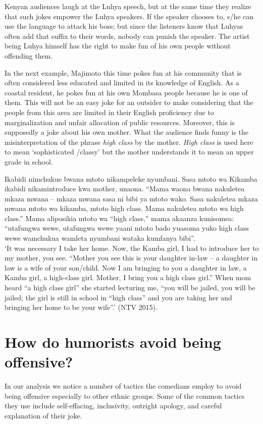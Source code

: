 \documentclass[output=paper]{langsci/langscibook}
\begin{document}
   Kenyan audiences laugh at the Luhya speech, but at the same time they realize that such jokes empower the Luhya speakers. If the speaker chooses to, s/he can use the language to attack his boss; but since the listeners know that Luhyas often add that suffix to their words, nobody can punish the speaker. The artist being Luhya himself has the right to make fun of his own people without offending them. 

In the next example, Majimoto this time pokes fun at his community that is often considered less educated and limited in its knowledge of English. As a coastal resident, he pokes fun at his own Mombasa people because he is one of them. This will not be an easy joke for an outsider to make considering that the people from this area are limited in their English proficiency due to marginalization and unfair allocation of public resources. Moreover, this is supposedly a joke about his own mother. What the audience finds funny is the misinterpretation of the phrase \textit{high class} by the mother. \textit{High class} is used here to mean ‘sophisticated /classy’ but the mother understands it to mean an upper grade in school. 

\ea
 Ikabidi nimchukue bwana mtoto nikampeleke nyumbani. Sasa mtoto wa Kikamba ikabidi nikamintroduce kwa mother, unaona. “Mama waona bwana nakuletea mkaza mwana – mkaza mwana sasa ni bibi ya mtoto wako. Sasa nakuletea mkaza mwana mtoto wa kikamba, mtoto high class. Mama nakuletea mtoto wa high class.” Mama aliposikia mtoto wa “high class,” mama akaanza kunisomea: “utafungwa wewe, utafungwa wewe yaani mtoto bado yuasoma yuko high class wewe wamchukua wamleta nyumbani wataka kumfanya bibi”.\\
\glt ‘It was necessary I take her home. Now, the Kamba girl, I had to introduce her to my mother, you see. “Mother you see this is your daughter in-law – a daughter in law is a wife of your son/child. Now I am bringing to you a daughter in law, a Kamba girl, a high-class girl. Mother, I bring you a high class girl.” When mom heard “a high class girl” she started lecturing me, “you will be jailed, you will be jailed; the girl is still in school in “high class” and you are taking her and bringing her home to be your wife”.’ (NTV 2015).
\z

\section{How do humorists avoid being offensive? }

   In our analysis we notice a number of tactics the comedians employ to avoid being offensive especially to other ethnic groups. Some of the common tactics they use include self-effacing, inclusivity, outright apology, and careful explanation of their joke.
\end{document}
